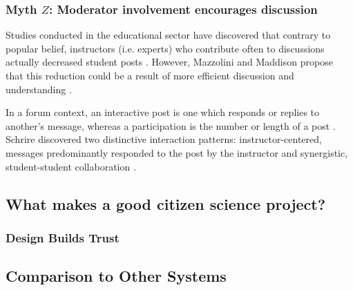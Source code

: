 \documentclass{sigchi}
\begin{document}
\subsubsection{Myth $Z$: Moderator involvement encourages discussion}

Studies conducted in the educational sector have discovered that contrary to popular belief, instructors (i.e. experts) who contribute often to discussions actually decreased student posts \cite{zydney2012creating}. However, Mazzolini and Maddison propose that this reduction could be a result of more efficient discussion and understanding \cite{mazzolini2007jump}. 

In a forum context, an interactive post is one which responds or replies to another's message, whereas a participation is the number or length of a post \cite{schrire2006knowledge}. 
Schrire discovered two distinctive interaction patterns: instructor-centered, messages predominantly responded to the post by the instructor and synergistic, student-student collaboration \cite{schrire2006knowledge}. 

\subsection{What makes a good citizen science project?}
\subsubsection{Design Builds Trust}

\subsection{Comparison to Other Systems}


\end{document}
